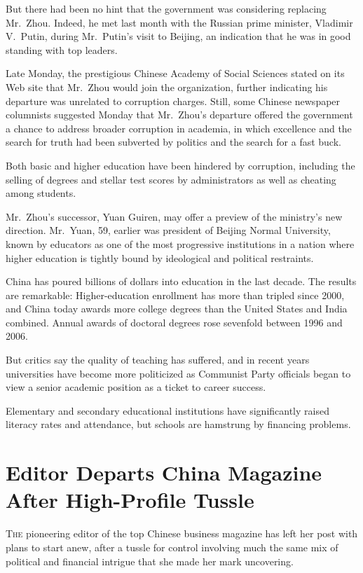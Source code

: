﻿\documentclass[12pt]{article}
\begin{document}
But there had been no hint that the government was considering replacing Mr.~Zhou. Indeed, he met
last month with the Russian prime minister, Vladimir V.~Putin, during Mr.~Putin's visit to Beijing,
an indication that he was in good standing with top leaders.

Late Monday, the prestigious Chinese Academy of Social Sciences stated on its Web site that Mr.~Zhou
would join the organization, further indicating his departure was unrelated to corruption charges.
Still, some Chinese newspaper columnists suggested Monday that Mr.~Zhou's departure offered the
government a chance to address broader corruption in academia, in which excellence and the search
for truth had been subverted by politics and the search for a fast buck.

Both basic and higher education have been hindered by corruption, including the selling of degrees
and stellar test scores by administrators as well as cheating among students.

Mr.~Zhou's successor, Yuan Guiren, may offer a preview of the ministry's new direction. Mr.~Yuan,
59, earlier was president of Beijing Normal University, known by educators as one of the most
progressive institutions in a nation where higher education is tightly bound by ideological and
political restraints.

China has poured billions of dollars into education in the last decade. The results are remarkable:
Higher-education enrollment has more than tripled since 2000, and China today awards more college
degrees than the United States and India combined. Annual awards of doctoral degrees rose sevenfold
between 1996 and 2006.

But critics say the quality of teaching has suffered, and in recent years universities have become
more politicized as Communist Party officials began to view a senior academic position as a ticket
to career success.

Elementary and secondary educational institutions have significantly raised literacy rates and
attendance, but schools are hamstrung by financing problems.

\section{Editor Departs China Magazine After High-Profile Tussle}

\lettrine{T}{he} pioneering editor of the top Chinese business magazine has
left her post with plans to start anew, after a tussle\cite{tussle} for control involving much the
same mix of political and financial intrigue that she made her mark uncovering.
\end{document}
